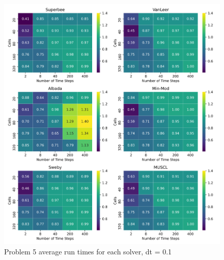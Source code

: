 \clearpage

\begin{figure}[p]
    \centering
    \includegraphics[width=6in]{images/chapter-5/problem5FluxLimiterConvergenceRate.png}
    \caption{Problem 5 average run times for each solver, dt = 0.1}
    \label{fig:problem5_runtimes}
\end{figure}

\clearpage

